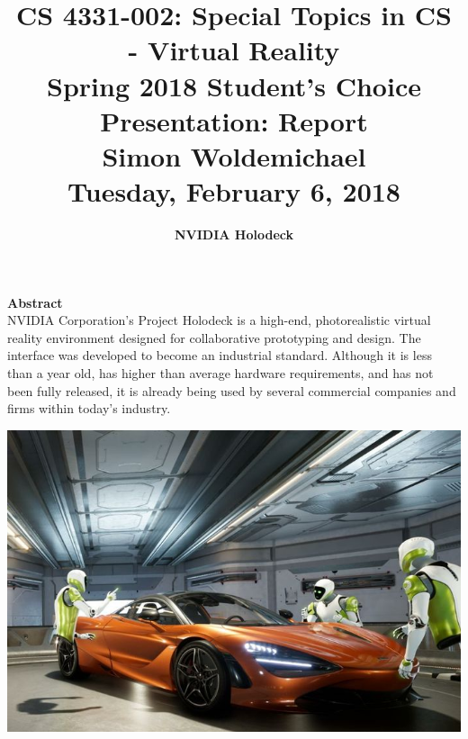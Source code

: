 \documentclass[11pt]{article}
\begin{document}
\title{\Large CS 4331-002: Special Topics in CS - Virtual Reality \\ Spring 2018 Student's Choice Presentation: Report \\ \Large Simon Woldemichael \\ Tuesday, February 6, 2018 \\}
\author{\LARGE \textbf{NVIDIA Holodeck}}
\vspace{-2cm}
\date{}

\maketitle
\vspace{-1cm}
\hspace{30pt}

\begin{center}
\textbf{Abstract}\\

NVIDIA Corporation's Project Holodeck is a high-end, photorealistic virtual reality environment designed for collaborative prototyping and design. The interface was developed to become an industrial standard. Although it is less than a year old, has higher than average hardware requirements, and has not been fully released, it is already being used by several commercial companies and firms within today's industry.
\end{center}
\centerline{
\includegraphics[scale=.4]{../images/Holodeck-web.jpg}}
\end{document}
